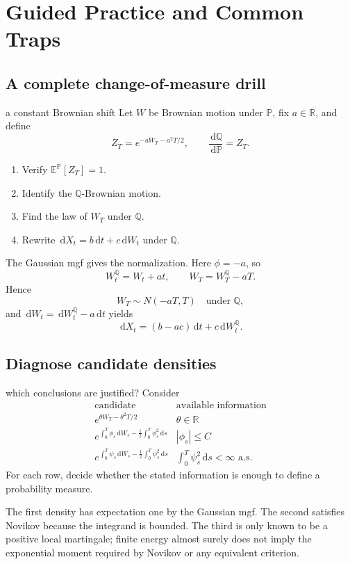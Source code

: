 \documentclass[10pt]{article}
\newcommand{\E}{\mathbb E}
\newcommand{\Pp}{\mathbb P}
\newcommand{\Q}{\mathbb Q}
\newcommand{\R}{\mathbb R}
\newcommand{\1}{\mathbf 1}
\newcommand{\dd}{\,\mathrm d}
\theoremstyle{definition}
\begin{document}
\section{Guided Practice and Common Traps}

\subsection{A complete change-of-measure drill}

\begin{studentexercise}{a constant Brownian shift}
Let \(W\) be Brownian motion under \(\Pp\), fix \(a\in\R\), and define
\[
Z_T=e^{-aW_T-a^2T/2},
\qquad
\frac{\dd\Q}{\dd\Pp}=Z_T.
\]
\begin{enumerate}
  \item Verify \(\E^{\Pp}[Z_T]=1\).
  \item Identify the \(\Q\)-Brownian motion.
  \item Find the law of \(W_T\) under \(\Q\).
  \item Rewrite \(\dd X_t=b\dd t+c\dd W_t\) under \(\Q\).
\end{enumerate}
\end{studentexercise}
\begin{shortsolution}
The Gaussian mgf gives the normalization. Here \(\phi=-a\), so
\[
W_t^{\Q}=W_t+at,
\qquad
W_T=W_T^{\Q}-aT.
\]
Hence
\[
W_T\sim N(-aT,T)\quad\text{under }\Q,
\]
and \(\dd W_t=\dd W_t^{\Q}-a\dd t\) yields
\[
\boxed{\dd X_t=(b-ac)\dd t+c\dd W_t^{\Q}.}
\]
\end{shortsolution}

\subsection{Diagnose candidate densities}

\begin{studentexercise}{which conclusions are justified?}
Consider
\[
\begin{array}{c|c}
\text{candidate} & \text{available information}\\ \hline
e^{\theta W_T-\theta^2T/2} & \theta\in\R\\
e^{\int_0^T\phi_s\dd W_s-\frac12\int_0^T\phi_s^2\dd s}
& |\phi_s|\leq C\\
e^{\int_0^T\psi_s\dd W_s-\frac12\int_0^T\psi_s^2\dd s}
& \int_0^T\psi_s^2\dd s<\infty\text{ a.s.}
\end{array}
\]
For each row, decide whether the stated information is enough to define a
probability measure.
\end{studentexercise}
\begin{shortsolution}
The first density has expectation one by the Gaussian mgf. The second
satisfies Novikov because the integrand is bounded. The third is only known
to be a positive local martingale; finite energy almost surely does not imply
the exponential moment required by Novikov or any equivalent criterion.
\end{shortsolution}
\end{document}
